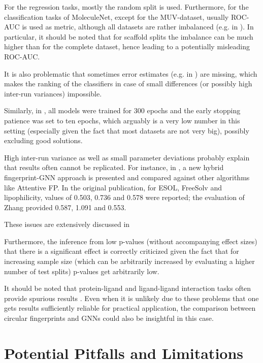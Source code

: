 For the regression tasks, mostly the random split is used. Furthermore, for the classification tasks of MoleculeNet, except for the MUV-dataset, usually ROC-AUC is used as metric, although all datasets are rather imbalanced (e.g. in \cite{Zhang.2024}). In particular, it should be noted that for scaffold splits the imbalance can be much higher than for the complete dataset, hence leading to a potentially misleading ROC-AUC.

It is also problematic that sometimes error estimates (e.g. in \cite{Zhang.2024}) are missing, which makes the ranking of the classifiers in case of small differences (or possibly high inter-run variances) impossible.

Similarly, in \cite{vanTilborg.2022}, all models were trained for 300 epochs and the early stopping patience was set to ten epochs, which arguably is a very low number in this setting (especially given the fact that most datasets are not very big), possibly excluding good solutions.

High inter-run variance as well as small parameter deviations probably explain that results often cannot be replicated.
For instance, in \cite{Zhang.2024}, a new hybrid fingerprint-GNN approach is presented and compared against other algorithms like Attentive FP. 
In the original publication, for ESOL, FreeSolv and lipophilicity, values of 0.503, 0.736 and 0.578 were reported; the evaluation of Zhang provided 0.587, 1.091 and 0.553.

These issues are extensively discussed in \cite{Wallach.2018}

Furthermore, the inference from low p-values (without accompanying effect sizes) that there is a significant effect is correctly criticized given the fact that for increasing sample size (which can be arbitrarily increased by evaluating a higher number of test splits) p-values get arbitrarily low. \cite{Robinson.2020} 

It should be noted that protein-ligand and ligand-ligand interaction tasks often provide spurious results \cite{Volkov.2022}.
Even when it is unlikely due to these problems that one gets results sufficiently reliable for practical application, the comparison between circular fingerprints and GNNs could also be insightful in this case.



\section{Potential Pitfalls and Limitations}

